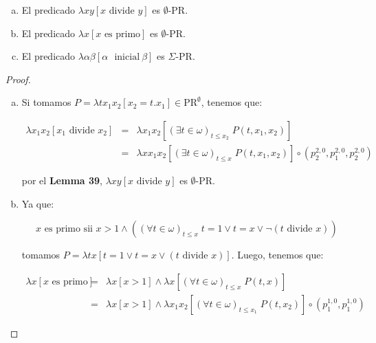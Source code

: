   \begin{lemma}
    \begin{enumerate}[a)]
      \item El predicado $\lambda xy\left[x \text{ divide } y\right]$ es $\emptyset$-PR.
      \item El predicado $\lambda x\left[x \text{ es primo}\right]$ es $\emptyset$-PR.
      \item El predicado $\lambda \alpha\beta \left[\alpha \text{\ }\mathrm{ inicial}\ \beta \right]$ es $\Sigma$-PR.
    \end{enumerate}
  \end{lemma}
  \begin{proof}
    \begin{enumerate}[a)]
      \item Si tomamos $P = \lambda tx_{1}x_{2}\left[x_{2}=t.x_{1}\right] \in \mathrm{PR}^{\emptyset}$, tenemos que:

        \begin{eqnarray}
          \nonumber \lambda x_{1}x_{2} \left[x_{1}\text{ divide } x_{2}\right] &=& \lambda x_{1}x_{2}\left[(\exists t
            \in \omega)_{t\leq x_{2}} \; P(t,x_{1},x_{2}) \right] \\
          \nonumber &=& \lambda xx_{1}x_{2}\left[(\exists t \in \omega)_{t\leq x} \; P(t,x_{1},x_{2})\right] \circ
            \left(p_{2}^{2,0}, p_{1}^{2,0}, p_{2}^{2,0}\right)
        \end{eqnarray}

        \PN por el \textbf{Lemma 39}, $\lambda xy\left[x \text{ divide } y\right]$ es $\emptyset$-PR.

      \item Ya que:

        \[
          x \text{ es primo sii } x > 1 \wedge \left((\forall t \in \omega)_{t\leq x} \; t=1 \vee t=x \vee \lnot
          (t\text{ divide } x)\right)
        \]

        \PN tomamos $P = \lambda tx \left[ t=1 \vee t=x \vee (t \text{ divide } x)\right]$. Luego, tenemos que:

        \begin{eqnarray}
          \nonumber \lambda x \left[x \text{ es primo}\right] &=& \lambda x \left[x > 1\right] \wedge \lambda x
            \left[(\forall t \in \omega)_{t \leq x} \; P(t,x) \right] \\
          \nonumber &=& \lambda x \left[x > 1\right] \wedge \lambda x_{1} x_{2} \left[(\forall t \in \omega)_{t \leq
            x_{1}} \; P(t,x_{2}) \right] \circ (p_{1}^{1,0}, p_{1}^{1,0})
        \end{eqnarray}


\end{enumerate}
\end{proof}
